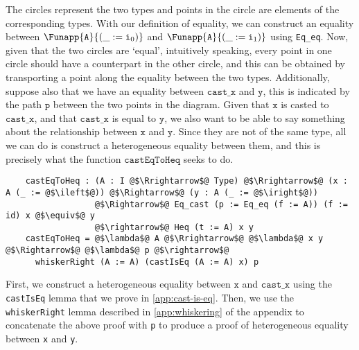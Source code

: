 \documentclass[12pt,twoside,maitrise]{dms}
\theoremstyle{definition}
\numberwithin{equation}{section}
\numberwithin{table}{chapter}
\numberwithin{figure}{chapter}
\newcommand\id[1] {\texttt{#1}}
\begin{document}
\begin{center}
\begin{tikzpicture}[x=0.75pt,y=0.75pt,yscale=-1,xscale=1]
\end{tikzpicture}

\end{center}

The circles represent the two types and points in the circle are elements of the
corresponding types. With our definition of equality, we can construct an
equality between $\Funapp{\id{A}}{(\earg{\_}{\ileft})}$ and
$\Funapp{\id{A}}{(\earg{\_}{\iright})}$ using \id{Eq\_eq}. Now, given that the
two circles are `equal', intuitively speaking, every point in one circle should
have a counterpart in the other circle, and this can be obtained by transporting a
point along the equality between the two types. Additionally, suppose also that
we have an equality between $\id{cast\_x}$ and $\id{y}$, this is indicated
by the path $\id{p}$ between the two points in the diagram. Given that $\id{x}$
is casted to $\id{cast\_x}$, and that $\id{cast\_x}$ is equal to
$\id{y}$, we also want to be able to say something about the relationship
between $\id{x}$ and $\id{y}$. Since they are not of the same type, all we can
do is construct a heterogeneous equality between them, and this is precisely
what the function $\id{castEqToHeq}$ seeks to do.

\begin{verbatim}
    castEqToHeq : (A : I @$\Rrightarrow$@ Type) @$\Rrightarrow$@ (x : A (_ := @$\ileft$@)) @$\Rightarrow$@ (y : A (_ := @$\iright$@))
                  @$\Rightarrow$@ Eq_cast (p := Eq_eq (f := A)) (f := id) x @$\equiv$@ y
                  @$\rightarrow$@ Heq (t := A) x y
    castEqToHeq = @$\lambda$@ A @$\Rrightarrow$@ @$\lambda$@ x y @$\Rightarrow$@ @$\lambda$@ p @$\rightarrow$@
      whiskerRight (A := A) (castIsEq (A := A) x) p
\end{verbatim}

First, we construct a heterogeneous equality between $\id{x}$ and $\id{cast\_x}$
using the \id{castIsEq} lemma that we prove in \autoref{app:cast-is-eq}. Then,
we use the \id{whiskerRight} lemma described in \autoref{app:whiskering} of the
appendix to concatenate the above proof with \id{p} to produce a proof of
heterogeneous equality between \id{x} and \id{y}.
\end{document}
